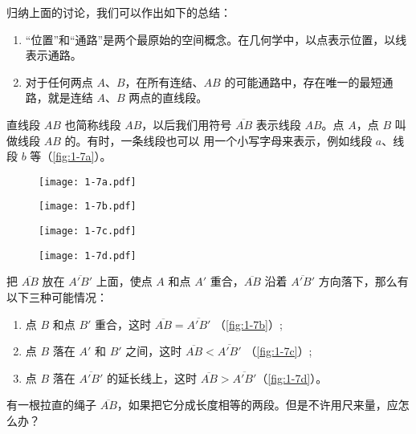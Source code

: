 归纳上面的讨论，我们可以作出如下的总结：

\begin{enumerate}[series=conclusion]
	\item “位置”和“通路”是两个最原始的空间概念。在几何学中，以点表示位置，以线表示通路。
	\item 对于任何两点 $A$、$B$，在所有连结、$AB$ 的可能通路中，存在唯一的最短通路，就是连结 $A$、$B$ 两点的直线段。
\end{enumerate}

直线段 $AB$ 也简称线段 $AB$，以后我们用符号 $\overline{AB}$ 表示线段
$AB$。点 $A$，点 $B$ 叫做线段 $AB$ 的。有时，一条线段也可以
用一个小写字母来表示，例如线段 $a$、线段 $b$ 等（\cref{fig:1-7a}）。

\begin{figure}
	\begin{minipage}[b]{0.4\linewidth}\centering
		\texttt{[image: 1-7a.pdf]}
		\subcaption{}\label{fig:1-7a}
	\end{minipage}
	\begin{minipage}[b]{0.4\linewidth}\centering
		\texttt{[image: 1-7b.pdf]}
		\subcaption{}\label{fig:1-7b}
	\end{minipage}
	\par\smallskip
	\begin{minipage}[b]{0.4\linewidth}\centering
		\texttt{[image: 1-7c.pdf]}
		\subcaption{}\label{fig:1-7c}
	\end{minipage}
	\begin{minipage}[b]{0.4\linewidth}\centering
		\texttt{[image: 1-7d.pdf]}
		\subcaption{}\label{fig:1-7d}
	\end{minipage}
	\caption{}\label{fig:1-7}
\end{figure}

把 $\overline{AB}$ 放在 $\overline{A'B'}$ 上面，使点 $A$ 和点 $A'$ 重合，$\overline{AB}$ 沿着 $\overline{A'B'}$ 方向落下，那么有以下三种可能情况：
\begin{enumerate}[1)]
	\item 点 $B$ 和点 $B'$ 重合，这时 $\overline{AB}=\overline{A'B'}$ （\cref{fig:1-7b}）;
	\item 点 $B$ 落在 $A'$ 和 $B'$ 之间，这时 $\overline{AB}<\overline{A'B'}$ （\cref{fig:1-7c}）;
	\item 点 $B$ 落在 $\overline{A'B'}$ 的延长线上，这时 $\overline{AB}>\overline{A'B'}$（\cref{fig:1-7d}）。
\end{enumerate} 

有一根拉直的绳子 $\overline{AB}$，如果把它分成长度相等的两段。但是不许用尺来量，应怎么办？

